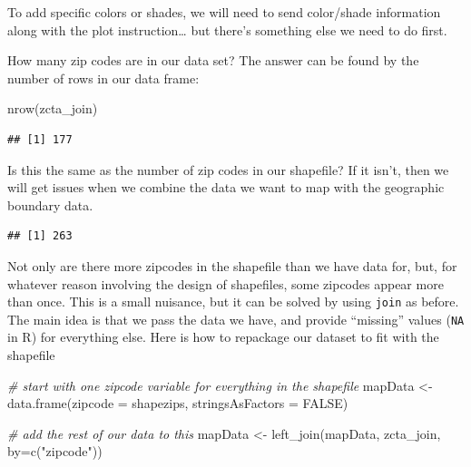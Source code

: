 \documentclass[
  openany]{book}
\newenvironment{Shaded}{\begin{snugshade}}{\end{snugshade}}
\newcommand{\AttributeTok}[1]{\textcolor[rgb]{0.77,0.63,0.00}{#1}}
\newcommand{\CommentTok}[1]{\textcolor[rgb]{0.56,0.35,0.01}{\textit{#1}}}
\newcommand{\ConstantTok}[1]{\textcolor[rgb]{0.00,0.00,0.00}{#1}}
\newcommand{\FunctionTok}[1]{\textcolor[rgb]{0.00,0.00,0.00}{#1}}
\newcommand{\NormalTok}[1]{#1}
\newcommand{\OtherTok}[1]{\textcolor[rgb]{0.56,0.35,0.01}{#1}}
\newcommand{\SpecialCharTok}[1]{\textcolor[rgb]{0.00,0.00,0.00}{#1}}
\newcommand{\StringTok}[1]{\textcolor[rgb]{0.31,0.60,0.02}{#1}}
\begin{document}
To add specific colors or shades, we will need to send color/shade information along with the plot instruction\ldots{} but there's something else we need to do first.

How many zip codes are in our data set? The answer can be found by the number of rows in our data frame:

\begin{Shaded}
\begin{Highlighting}[]
\FunctionTok{nrow}\NormalTok{(zcta\_join)}
\end{Highlighting}
\end{Shaded}

\begin{verbatim}
## [1] 177
\end{verbatim}

Is this the same as the number of zip codes in our shapefile? If it isn't, then we will get issues when we combine the data we want to map with the geographic boundary data.

\begin{Shaded}
\end{Shaded}

\begin{verbatim}
## [1] 263
\end{verbatim}

Not only are there more zipcodes in the shapefile than we have data for, but, for whatever reason involving the design of shapefiles, some zipcodes appear more than once. This is a small nuisance, but it can be solved by using \texttt{join} as before. The main idea is that we pass the data we have, and provide ``missing'' values (\texttt{NA} in R) for everything else.
Here is how to repackage our dataset to fit with the shapefile

\begin{Shaded}
\begin{Highlighting}[]
\CommentTok{\# start with one zipcode variable for everything in the shapefile}
\NormalTok{mapData }\OtherTok{\textless{}{-}} \FunctionTok{data.frame}\NormalTok{(}\AttributeTok{zipcode =}\NormalTok{ shapezips, }\AttributeTok{stringsAsFactors =} \ConstantTok{FALSE}\NormalTok{)}

\CommentTok{\# add the rest of our data to this}
\NormalTok{mapData }\OtherTok{\textless{}{-}} \FunctionTok{left\_join}\NormalTok{(mapData, zcta\_join, }\AttributeTok{by=}\FunctionTok{c}\NormalTok{(}\StringTok{"zipcode"}\NormalTok{))}
\end{Highlighting}
\end{Shaded}
\end{document}
